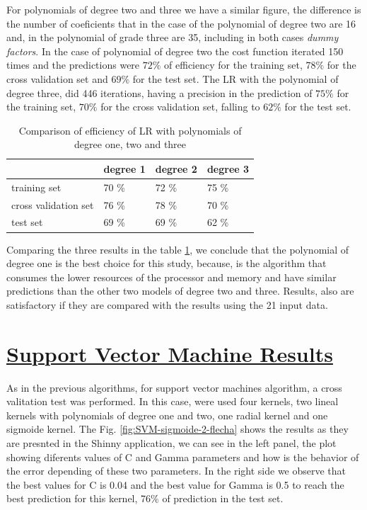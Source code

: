 \documentclass[]{book}
\begin{document}
For polynomials of degree two and three we have a similar figure, the
difference is the number of coeficients that in the case of the
polynomial of degree two are 16 and, in the polynomial of grade three
are 35, including in both cases \emph{dummy factors}. In the case of
polynomial of degree two the cost function iterated 150 times and the
predictions were \(72\%\) of efficiency for the training set, \(78\%\)
for the cross validation set and \(69\%\) for the test set. The LR with
the polynomial of degree three, did 446 iterations, having a precision
in the prediction of \(75\%\) for the training set, \(70\%\) for the
cross validation set, falling to \(62\%\) for the test set.

\begin{table}[ht]
\centering
\caption{Comparison of efficiency of LR with polynomials of degree one, two and three}
\label{tab:results-of-efficiency-logistic-regression}
\begin{tabular}{llll}
\hline
                     & degree 1 & degree 2 & degree 3 \\ \hline
training set         & 70 \%    & 72 \%    & 75 \%    \\
cross validation set & 76 \%    & 78 \%    & 70 \%    \\
test set             & 69 \%    & 69 \%    & 62 \%    \\ \hline
\end{tabular}
\end{table}

Comparing the three results in the table
\ref{tab:results-of-efficiency-logistic-regression}, we conclude that
the polynomial of degree one is the best choice for this study, because,
is the algorithm that consumes the lower resources of the processor and
memory and have similar predictions than the other two models of degree
two and three. Results, also are satisfactory if they are compared with
the results using the 21 input data.

\section{\texorpdfstring{\protect\hyperlink{SVM-results}{Support Vector
Machine
Results}}{Support Vector Machine Results}}\label{support-vector-machine-results}

As in the previous algorithms, for support vector machines algorithm, a
cross valitation test was performed. In this case, were used four
kernels, two lineal kernels with polynomials of degree one and two, one
radial kernel and one sigmoide kernel. The Fig.
\ref{fig:SVM-sigmoide-2-flecha} shows the results as they are presnted
in the Shinny application, we can see in the left panel, the plot
showing diferents values of C and Gamma parameters and how is the
behavior of the error depending of these two parameters. In the right
side we observe that the best values for C is 0.04 and the best value
for Gamma is 0.5 to reach the best prediction for this kernel, 76\% of
prediction in the test set.
\end{document}
